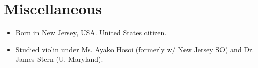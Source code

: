 \documentclass[10pt,letterpaper]{article}
\begin{document}
\section*{Miscellaneous}

\begin{itemize}
\item Born in New Jersey, USA. United States citizen.
\item Studied violin under Ms. Ayako Hosoi (formerly w/ New Jersey SO) and Dr. James Stern (U. Maryland).
\end{itemize}
\end{document}
